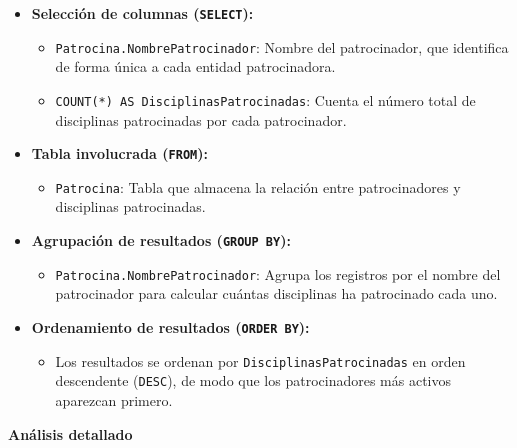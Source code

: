\begin{itemize} \item \textbf{Selección de columnas (\texttt{SELECT}):} \begin{itemize} \item \texttt{Patrocina.NombrePatrocinador}: Nombre del patrocinador, que identifica de forma única a cada entidad patrocinadora. \item \texttt{COUNT(*) AS DisciplinasPatrocinadas}: Cuenta el número total de disciplinas patrocinadas por cada patrocinador. \end{itemize}
	
	\item \textbf{Tabla involucrada (\texttt{FROM}):} \begin{itemize} \item \texttt{Patrocina}: Tabla que almacena la relación entre patrocinadores y disciplinas patrocinadas. \end{itemize}
	
	\item \textbf{Agrupación de resultados (\texttt{GROUP BY}):} \begin{itemize} \item \texttt{Patrocina.NombrePatrocinador}: Agrupa los registros por el nombre del patrocinador para calcular cuántas disciplinas ha patrocinado cada uno. \end{itemize}
	
	\item \textbf{Ordenamiento de resultados (\texttt{ORDER BY}):} \begin{itemize} \item Los resultados se ordenan por \texttt{DisciplinasPatrocinadas} en orden descendente (\texttt{DESC}), de modo que los patrocinadores más activos aparezcan primero. \end{itemize} \end{itemize}

\textbf{Análisis detallado}

